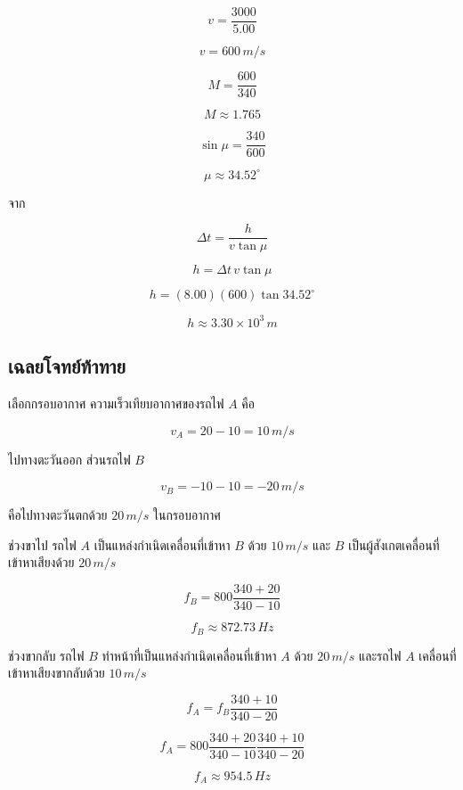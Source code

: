 \[
v=\frac{3000}{5.00}
\]

\[
\boxed{v=600\,\si{m/s}}
\]

\[
M=\frac{600}{340}
\]

\[
\boxed{M\approx1.765}
\]

\[
\sin\mu=\frac{340}{600}
\]

\[
\boxed{\mu\approx34.52^\circ}
\]

จาก

\[
\Delta t=\frac{h}{v\tan\mu}
\]

\[
h=\Delta t\,v\tan\mu
\]

\[
h=(8.00)(600)\tan34.52^\circ
\]

\[
\boxed{h\approx3.30\times10^3\,\si{m}}
\]

\subsection*{เฉลยโจทย์ท้าทาย}

เลือกกรอบอากาศ ความเร็วเทียบอากาศของรถไฟ $A$ คือ

\[
v_A=20-10=10\,\si{m/s}
\]

ไปทางตะวันออก ส่วนรถไฟ $B$

\[
v_B=-10-10=-20\,\si{m/s}
\]

คือไปทางตะวันตกด้วย $20\,\si{m/s}$ ในกรอบอากาศ

ช่วงขาไป รถไฟ $A$ เป็นแหล่งกำเนิดเคลื่อนที่เข้าหา $B$ ด้วย $10\,\si{m/s}$ และ $B$ เป็นผู้สังเกตเคลื่อนที่เข้าหาเสียงด้วย $20\,\si{m/s}$

\[
f_B
=800\frac{340+20}{340-10}
\]

\[
f_B\approx872.73\,\si{Hz}
\]

ช่วงขากลับ รถไฟ $B$ ทำหน้าที่เป็นแหล่งกำเนิดเคลื่อนที่เข้าหา $A$ ด้วย $20\,\si{m/s}$ และรถไฟ $A$ เคลื่อนที่เข้าหาเสียงขากลับด้วย $10\,\si{m/s}$

\[
f_A
=f_B\frac{340+10}{340-20}
\]

\[
f_A
=800
\frac{340+20}{340-10}
\frac{340+10}{340-20}
\]

\[
\boxed{f_A\approx954.5\,\si{Hz}}
\]



\fussy